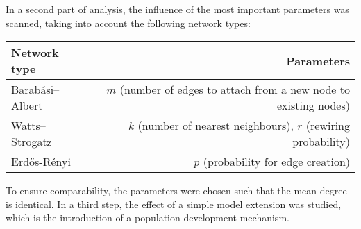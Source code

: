 In a second part of analysis, the influence of the most important parameters was scanned, taking into account the following network types:

\begin{table}[h!]
\centering
\begin{tabular}{l|r}
Network type & Parameters \\\hline
Barabási–Albert & $m$ (number of edges to attach from a new node to existing nodes) \\
Watts–Strogatz & $k$ (number of nearest neighbours), $r$ (rewiring probability) \\
Erdős-Rényi & $p$ (probability for edge creation)
\end{tabular}
\end{table}

To ensure comparability, the parameters were chosen such that the mean degree is identical.
In a third step, the effect of a simple model extension was studied, which is the introduction of a population development mechanism.
